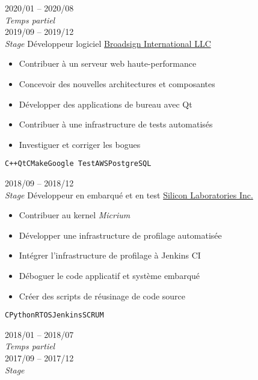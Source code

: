 \documentclass[9pt]{developercv} %
\begin{document}
\begin{minipage}[t]{0.8\textwidth}

\begin{entrylist}
	\entry
		{2020/01 -- 2020/08\\{\small\emph{Temps partiel}}\\2019/09 -- 2019/12\\{\small\emph{Stage}}}
		{Développeur logiciel}
		{\href{https://broadsign.com/}{Broadsign International LLC}}
		{
			\vspace{-14pt}
			\begin{itemize}
				\renewcommand{\labelitemi}{\raisebox{.45ex}{\rule{.6ex}{.6ex}}}
				\setlength\itemsep{-1pt}
				\item Contribuer à un serveur web haute-performance
				\item Concevoir des nouvelles architectures et composantes
				\item Développer des applications de bureau avec Qt
				\item Contribuer à une infrastructure de tests automatisés
				\item Investiguer et corriger les bogues
			\end{itemize}
			\vspace{-4pt}
			\texttt{C++}\slashsep\texttt{Qt}\slashsep\texttt{CMake}\slashsep\texttt{Google Test}\slashsep\texttt{AWS}\slashsep\texttt{PostgreSQL}
		}
	\entry
		{2018/09 -- 2018/12\\{\small\emph{Stage}}}
		{Développeur en embarqué et en test}
		{\href{https://www.silabs.com/}{Silicon Laboratories Inc.}}
		{
			\vspace{-14pt}
			\begin{itemize}
				\renewcommand{\labelitemi}{\raisebox{.45ex}{\rule{.6ex}{.6ex}}}
				\setlength\itemsep{-1pt}
				\item Contribuer au kernel \emph{Micrium}
				\item Développer une infrastructure de profilage automatisée
				\item Intégrer l'infrastructure de profilage à Jenkins CI
				\item Déboguer le code applicatif et système embarqué
				\item Créer des scripts de réusinage de code source
			\end{itemize}
			\vspace{-4pt}
			\texttt{C}\slashsep\texttt{Python}\slashsep\texttt{RTOS}\slashsep\texttt{Jenkins}\slashsep\texttt{SCRUM}
		}
	\entry
		{2018/01 -- 2018/07\\{\small\emph{Temps partiel}}\\2017/09 -- 2017/12\\{\small\emph{Stage}}}

\end{entrylist}
\end{minipage}
\end{document}
